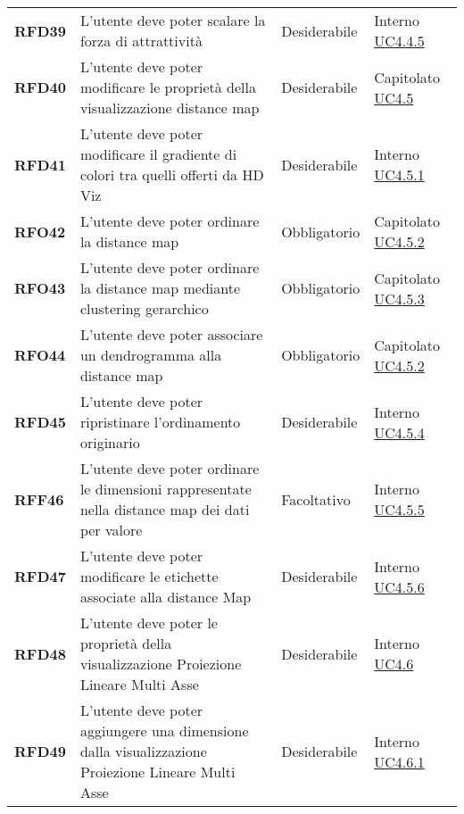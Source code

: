 \begin{longtable}[H]{>{\centering\bfseries}m{2cm} >{\centering}m{9cm} >{\centering}m{2.5cm} >{\centering\arraybackslash}m{2.5cm}}
    RFD39
    & L'utente deve poter scalare la forza di attrattività
    & Desiderabile
    & Interno \hyperref[ssub:uc4.4.5]{UC4.4.5} \\

    RFD40
    & L'utente deve poter modificare le proprietà della visualizzazione distance map
    & Desiderabile
    & Capitolato \hyperref[ssub:uc4.5]{UC4.5} \\

    RFD41
    & L'utente deve poter modificare il gradiente di colori tra quelli offerti da HD Viz
    & Desiderabile
    & Interno \hyperref[ssub:uc4.5.1]{UC4.5.1} \\

    RFO42
    & L'utente deve poter ordinare la distance map
    & Obbligatorio
    & Capitolato \hyperref[ssub:uc4.5.2]{UC4.5.2} \\

    RFO43
    & L'utente deve poter ordinare la distance map mediante clustering gerarchico
    & Obbligatorio
    & Capitolato \hyperref[ssub:uc4.5.3]{UC4.5.3} \\

    RFO44
    & L'utente deve poter associare un dendrogramma alla distance map
    & Obbligatorio
    & Capitolato \hyperref[ssub:uc4.5.2]{UC4.5.2} \\

    RFD45
    & L'utente deve poter ripristinare l'ordinamento originario
    & Desiderabile
    & Interno \hyperref[ssub:uc4.5.4]{UC4.5.4} \\

    RFF46
    & L'utente deve poter ordinare le dimensioni rappresentate nella distance map dei dati per valore
    & Facoltativo
    & Interno \hyperref[ssub:uc4.5.5]{UC4.5.5} \\

    RFD47
    & L'utente deve poter modificare le etichette associate alla distance Map
    & Desiderabile
    & Interno \hyperref[ssub:uc4.5.6]{UC4.5.6} \\

    RFD48
    & L'utente deve poter le proprietà della visualizzazione Proiezione Lineare Multi Asse
    & Desiderabile
    & Interno  \hyperref[ssub:uc4.6.1]{UC4.6} \\

    RFD49
    & L'utente deve poter aggiungere una dimensione dalla visualizzazione Proiezione Lineare Multi Asse
    & Desiderabile
    & Interno  \hyperref[par:uc4.6.1]{UC4.6.1} \\


\end{longtable}
